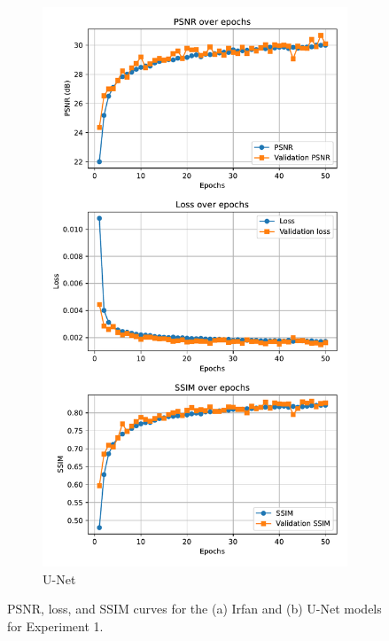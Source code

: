 \begin{figure}
    \ContinuedFloat
    \begin{subfigure}{\textwidth}
        \centering
        \includegraphics[height=0.9\textheight]{img/ch6/supervised/psnr_loss_unet.pdf}
        \caption{U-Net}
        \label{fig:denoising-exp1-curves-unet}
    \end{subfigure}
    \caption{PSNR, loss, and SSIM curves for the (a) Irfan and (b) U-Net models for Experiment 1.}
    \label{fig:denoising-exp1-curves}
\end{figure}


